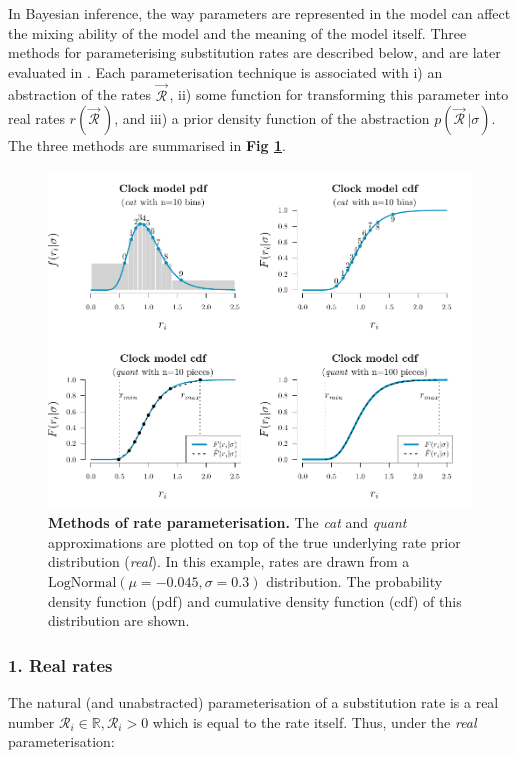 \documentclass[10pt,letterpaper]{article}
\begin{document}
In Bayesian inference, the way parameters are represented in the model can affect the mixing ability of the model and the meaning of the model itself. Three methods for parameterising substitution rates are described below, and are later evaluated in \textbf{}. Each parameterisation technique is associated with i) an abstraction of the rates $\vec{\mathcal{R}}^{\,}$, ii) some function for transforming this parameter into real rates $r(\vec{\mathcal{R}}^{\,})$, and iii) a prior density function of the abstraction $p(\vec{\mathcal{R}}^{\,} | \sigma) $. The three methods are summarised in \textbf{Fig \ref{fig:rateparams}}.


\begin{figure}[!h]
\includegraphics[width=\textwidth]{Figures/rateparameterisation.pdf}
\caption{\textbf{Methods of rate parameterisation.} The \textit{cat} and \textit{quant} approximations are plotted on top of the true underlying rate prior distribution (\textit{real}). In this example, rates are drawn from a $\text{LogNormal}(\mu = -0.045, \sigma = 0.3)$ distribution. The probability density function (pdf) and cumulative density function (cdf) of this distribution are shown.}
\label{fig:rateparams}
\end{figure}




\subsubsection*{1. Real rates}
The natural (and unabstracted) parameterisation of a substitution rate is a real number $\mathcal{R}_i \in \mathbb{R}, \mathcal{R}_i > 0$ which is equal to the rate itself. Thus, under the \textit{real} parameterisation:
\end{document}
